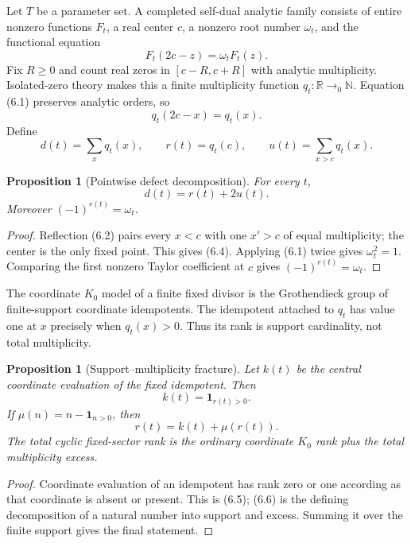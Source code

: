 \documentclass[11pt,reqno]{amsart}
\newtheorem{proposition}[theorem]{Proposition}
\newcommand{\R}{\mathbb R}
\newcommand{\N}{\mathbb N}
\begin{document}
Let $T$ be a parameter set.  A completed self-dual analytic family consists of entire nonzero
functions $F_t$, a real center $c$, a nonzero root number $\omega_t$, and the functional equation
\[
                    F_t(2c-z)=\omega_tF_t(z).        \tag{6.1}
\]
Fix $R\ge0$ and count real zeros in $[c-R,c+R]$ with analytic multiplicity.  Isolated-zero theory
makes this a finite multiplicity function $q_t:\R\to_0\N$.  Equation (6.1) preserves analytic
orders, so
\[
                    q_t(2c-x)=q_t(x).                \tag{6.2}
\]
Define
\[
 d(t)=\sum_xq_t(x),\qquad r(t)=q_t(c),\qquad
 u(t)=\sum_{x>c}q_t(x).                              \tag{6.3}
\]

\begin{proposition}[Pointwise defect decomposition]\label{prop:defect}
For every $t$,
\[
                       d(t)=r(t)+2u(t).              \tag{6.4}
\]
Moreover $(-1)^{r(t)}=\omega_t$.
\end{proposition}

\begin{proof}
Reflection (6.2) pairs every $x<c$ with one $x'>c$ of equal multiplicity; the center is the only
fixed point.  This gives (6.4).  Applying (6.1) twice gives $\omega_t^2=1$.  Comparing the first
nonzero Taylor coefficient at $c$ gives $(-1)^{r(t)}=\omega_t$.
\end{proof}

The coordinate $K_0$ model of a finite fixed divisor is the Grothendieck group of finite-support
coordinate idempotents.  The idempotent attached to $q_t$ has value one at $x$ precisely when
$q_t(x)>0$.  Thus its rank is support cardinality, not total multiplicity.

\begin{proposition}[Support--multiplicity fracture]\label{prop:support}
Let $k(t)$ be the central coordinate evaluation of the fixed idempotent.  Then
\[
                       k(t)=\mathbf1_{r(t)>0}.        \tag{6.5}
\]
If $\mu(n)=n-\mathbf1_{n>0}$, then
\[
                       r(t)=k(t)+\mu(r(t)).           \tag{6.6}
\]
The total cyclic fixed-sector rank is the ordinary coordinate $K_0$ rank plus the total
multiplicity excess.
\end{proposition}

\begin{proof}
Coordinate evaluation of an idempotent has rank zero or one according as that coordinate is absent
or present.  This is (6.5); (6.6) is the defining decomposition of a natural number into support
and excess.  Summing it over the finite support gives the final statement.
\end{proof}
\end{document}

